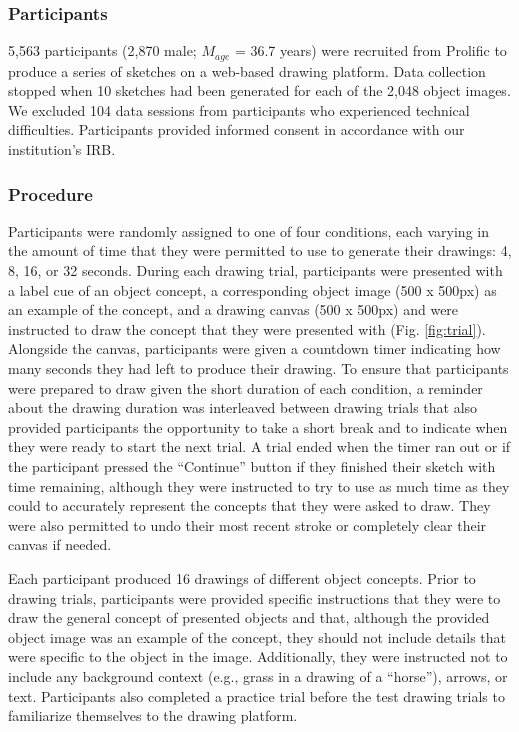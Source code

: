 \documentclass[10pt,letterpaper]{article}
\begin{document}
\subsubsection{Participants} 
5,563 participants (2,870 male; $M_{age}$ = 36.7 years) were recruited from Prolific to produce a series of sketches on a web-based drawing platform. 
Data collection stopped when 10 sketches had been generated for each of the 2,048 object images.
We excluded 104 data sessions from participants who experienced technical difficulties.
Participants provided informed consent in accordance with our institution’s IRB.

\subsubsection{Procedure}
Participants were randomly assigned to one of four conditions, each varying in the amount of time that they were permitted to use to generate their drawings: 4, 8, 16, or 32 seconds. 
During each drawing trial, participants were presented with a label cue of an object concept, a corresponding object image (500 x 500px) as an example of the concept, and a drawing canvas (500 x 500px) and were instructed to draw the concept that they were presented with (Fig. \ref{fig:trial}). 
Alongside the canvas, participants were given a countdown timer indicating how many seconds they had left to produce their drawing. 
To ensure that participants were prepared to draw given the short duration of each condition, a reminder about the drawing duration was interleaved between drawing trials that also provided participants the opportunity to take a short break and to indicate when they were ready to start the next trial. 
A trial ended when the timer ran out or if the participant pressed the ``Continue'' button if they finished their sketch with time remaining, although they were instructed to try to use as much time as they could to accurately represent the concepts that they were asked to draw.
They were also permitted to undo their most recent stroke or completely clear their canvas if needed. 

Each participant produced 16 drawings of different object concepts.
Prior to drawing trials, participants were provided specific instructions that they were to draw the general concept of presented objects and that, although the provided object image was an example of the concept, they should not include details that were specific to the object in the image. 
Additionally, they were instructed not to include any background context (e.g., grass in a drawing of a ``horse''), arrows, or text.
Participants also completed a practice trial before the test drawing trials to familiarize themselves to the drawing platform.
\end{document}
